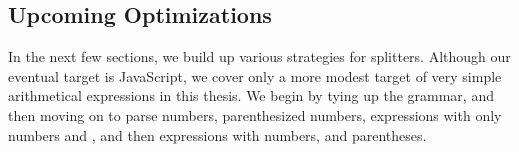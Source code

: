     
  \subsection{Upcoming Optimizations}
    In the next few sections, we build up various strategies for splitters.  Although our eventual target is JavaScript, we cover only a more modest target of very simple arithmetical expressions in this thesis.  We begin by tying up the  grammar, and then moving on to parse numbers, parenthesized numbers, expressions with only numbers and \terminal{+}, and then expressions with numbers, \terminal{+} and parentheses. 
    
